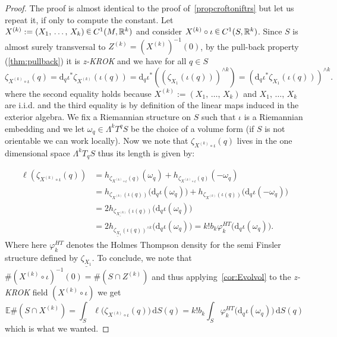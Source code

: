 \documentclass[AHL, Unicode, longabstracts, published]{cedram}
\newcommand{\R}{\mathbb{R}}
\newcommand{\EE}{\mathbb{E}}
\newcommand{\dd}{\mathrm{d}}
\newcommand{\seg}{\underline}
\newcommand{\zkrok}{\emph{z-KROK}\xspace}
\newcommand*\randin{
\mathchoice {\raisebox{-.35ex}{$\displaystyle{^\subset}$}\mkern-11.5mu\raisebox{+.45ex}{$\displaystyle{_\subset}$}} {\mkern+1mu\raisebox{-.27ex}{$\textstyle{^\subset}$}\mkern-11.7mu\raisebox{+.45ex}{$\textstyle{_\subset}$}} {\raisebox{.35ex}{$\scriptstyle\subset$}\mkern-14mu\raisebox{-.15ex}{$\scriptstyle\subset$}} {\raisebox{.3ex}{$\scriptscriptstyle\subset$}\mkern-13.5mu\raisebox{-.10ex}{$\scriptscriptstyle\subset$}}}
\begin{document}
\begin{proof}
The proof is almost identical to the proof of~\cref{propcroftoniftrs} but let us repeat it, if only to compute the constant. Let $X^{(k)}:=(X_1,\,\ldots,\,X_k)\,\randin\, C^1(M,\R^k)$ and consider $X^{(k)}\circ \iota\,\randin\, C^1(S,\R^k)$. Since $S$ is almost surely transversal to $Z^{(k)}=(X^{(k)})^{-1}(0)$, by the pull-back property (\cref{thm:pullback}) it is \zkrok and we have for all $q\in S$
\begin{equation*}
\zeta_{X^{(k)}\circ \iota}(q)=\dd_q\iota^* \zeta_{X^{(k)}}(\iota(q))=\dd_q\iota^* \left((\zeta_{X_1}(\iota(q)))^{\wedge k}\right)=\left(\dd_q\iota^* \zeta_{X_1}(\iota(q))\right)^{\wedge k}.
\end{equation*}
where the second equality holds because $X^{(k)}:=(X_1,\,\ldots,\,X_k)$ and $X_1,\,\ldots,\,X_k$ are i.i.d. and the third equality is by definition of the linear maps induced in the exterior algebra. We fix a Riemannian structure on $S$ such that $\iota$ is a Riemannian embedding and we let $\omega_q\in \Lambda^kT^qS$ be the choice of a volume form (if $S$ is not orientable we can work locally). Now we note that $\zeta_{X^{(k)}\circ \iota}(q)$ lives in the one dimensional space $\Lambda^kT_qS$ thus its length is given by:

\begin{align*}
\ell\left(\zeta_{X^{(k)}\circ\iota}(q)\right) &=h_{\zeta_{X^{(k)}\circ\iota}(q)}(\omega_q)+h_{\zeta_{X^{(k)}\circ\iota}(q)}(-\omega_q) \\
&=h_{\zeta_{X^{(k)}}(\iota(q))}\big(\dd_q\iota(\omega_q)\big)+h_{\zeta_{X^{(k)}}(\iota(q))}\big(\dd_q\iota(-\omega_q)\big) \\
&=2h_{\seg{\zeta_{X^{(k)}}}(\iota(q))}\big(\dd_q\iota(\omega_q)\big) \\
&=2h_{\seg{\zeta_{X_1}}(\iota(q))^{\wedge k}}\big(\dd_q\iota(\omega_q)\big)=k!b_k \varphi_k^{HT}\big(\dd_q\iota(\omega_q)\big).
\end{align*}
Where here $\varphi_k^{HT}$ denotes the Holmes Thompson density for the semi Finsler structure defined by $\seg{\zeta_{X_1}}$. To conclude, we note that $\#(X^{(k)}\circ\iota)^{-1}(0)=\#(S\cap Z^{(k)})$ and thus applying~\cref{cor:Evolvol} to the \zkrok field $(X^{(k)}\circ\iota)$ we get
\begin{equation*}
\EE\#\left(S\cap X^{(k)}\right)=\int_S\ell\big(\zeta_{X^{(k)}\circ\iota}(q)\big)\,\dd S(q)=k!b_k\int_S\varphi_k^{HT}\big(\dd_q\iota(\omega_q)\big)\,\dd S(q)
\end{equation*}
which is what we wanted.
\end{proof}
\end{document}
